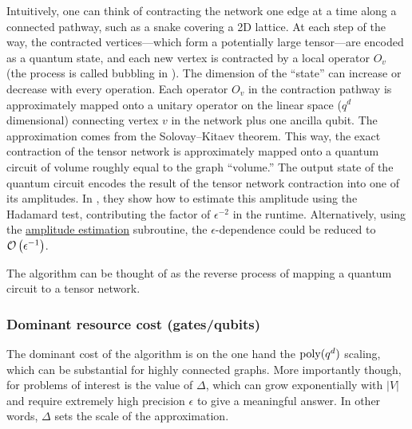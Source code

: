 \begin{refsection}
Intuitively, one can think of contracting the network one edge at a time along a connected pathway, such as a snake covering a 2D lattice. At each step of the way, the contracted vertices---which form a potentially large tensor---are encoded as a quantum state, and each new vertex is contracted by a local operator $O_v$ (the process is called bubbling in \cite{arad2010quantum}). The dimension of the ``state'' can increase or decrease with every operation. Each operator $O_v$ in the contraction pathway is approximately mapped onto a unitary operator on the linear space ($q^d$ dimensional) connecting vertex $v$ in the network plus one ancilla qubit. The approximation comes from the Solovay--Kitaev theorem. This way, the exact contraction of the tensor network is approximately mapped onto a quantum circuit of volume roughly equal to the graph ``volume.'' The output state of the quantum circuit encodes the result of the tensor network contraction into one of its amplitudes. In \cite{arad2010quantum}, they show how to estimate this amplitude using the Hadamard test, contributing the factor of $\epsilon^{-2}$ in the runtime. Alternatively, using the \hyperref[prim:AmpEst]{amplitude estimation} subroutine, the $\epsilon$-dependence could be reduced to $\mathcal{O}\left( \epsilon^{-1} \right)$.

The algorithm can be thought of as the  reverse process of mapping a quantum circuit to a tensor network.  



\subsubsection*{Dominant resource cost (gates/qubits)}

The dominant cost of the algorithm is on the one hand the $ {\rm poly}(q^d)$ scaling, which can be substantial for highly connected graphs. More importantly though, for problems of interest is  the value of $\Delta$, which can grow exponentially with $|V|$ and require extremely high precision $\epsilon$ to give a meaningful answer. In other words, $\Delta$ sets the scale of the approximation.  


\end{refsection}
